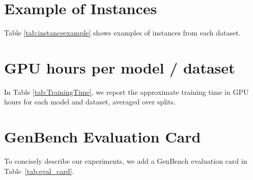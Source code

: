 \section{Example of Instances}
\label{appendix:examples}

Table \ref{tab:instanceexample}  shows examples of instances from each dataset.

\section{GPU hours per model / dataset}
In Table \ref{tab:TrainingTime}, we report the approximate training time in GPU hours for each model and dataset, averaged over splits.



\section{GenBench Evaluation Card}

To concisely describe our experiments, we add a GenBench evaluation card \citep{hupkes2022sotageneralisation} in Table~\ref{tab:eval_card}.

%     

